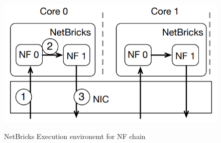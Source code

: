 \documentclass[10pt, a4paper, conference]{IEEEtran}
\begin{document}
\begin{figure}
	\centering
	\includegraphics[width=\linewidth]{figures/fig10}
	\caption{NetBricks Execution environemt for NF chain}
	\cite{Panda2016}
	\label{key12}
\end{figure}
\end{document}
